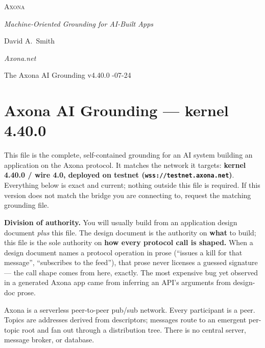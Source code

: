 \documentclass[
  nobib]{tufte-handout}
\author{}
\date{}
\begin{document}
\thispagestyle{empty}
\null\vfill
\begin{center}
{\fontsize{48}{52}\selectfont \textsc{Axona}\par}
\vspace{0.6em}
{\Large\itshape Machine-Oriented Grounding for AI-Built Apps\par}
\vspace{4em}
{\large David A.~Smith\par}
{\itshape\small Axona.net\par}
\vspace{2em}
{\small The Axona AI Grounding \quad v4.40.0 -07-24\par}
\end{center}
\vfill
\null
\newpage
\pagestyle{ndhtplain}
\thispagestyle{ndhtplain}
\setcounter{page}{1}

\section{Axona AI Grounding --- kernel
4.40.0}\label{axona-ai-grounding-kernel-4.40.0}

This file is the complete, self-contained grounding for an AI system
building an application on the Axona protocol. It matches the network it
targets: \textbf{kernel 4.40.0 / wire 4.0, deployed on testnet
(\texttt{wss://testnet.axona.net})}. Everything below is exact and
current; nothing outside this file is required. If this version does not
match the bridge you are connecting to, request the matching grounding
file.

\textbf{Division of authority.} You will usually build from an
application design document \emph{plus} this file. The design document
is the authority on \textbf{what} to build; this file is the sole
authority on \textbf{how every protocol call is shaped.} When a design
document names a protocol operation in prose (``issues a kill for that
message'', ``subscribes to the feed''), that prose never licenses a
guessed signature --- the call shape comes from here, exactly. The most
expensive bug yet observed in a generated Axona app came from inferring
an API's arguments from design-doc prose.

Axona is a serverless peer-to-peer pub/sub network. Every participant is
a peer. Topics are addresses derived from descriptors; messages route to
an emergent per-topic root and fan out through a distribution tree.
There is no central server, message broker, or database.
\end{document}
